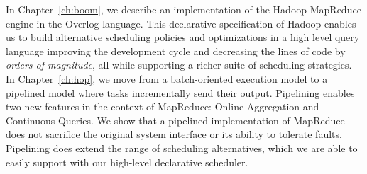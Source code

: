 In Chapter~\ref{ch:boom}, we describe an implementation of the Hadoop MapReduce engine in the Overlog language. 
This declarative specification of Hadoop enables us to build alternative scheduling policies and optimizations in a high 
level query language improving the development cycle and decreasing the lines of code by {\em orders of magnitude},
all while supporting a richer suite of scheduling strategies. In Chapter~\ref{ch:hop}, we move from a batch-oriented execution 
model to a pipelined model where tasks incrementally send their output. Pipelining enables two new features in the context of 
MapReduce: Online Aggregation and Continuous Queries. We show that a pipelined implementation of MapReduce does not sacrifice the original system
interface or its ability to tolerate faults. Pipelining does extend the range of scheduling alternatives, which we are able to easily support 
with our high-level declarative scheduler. 















